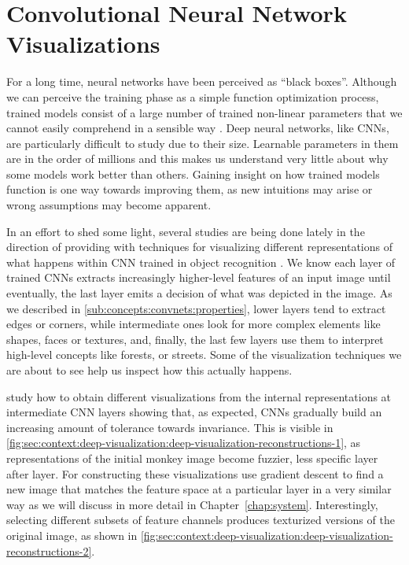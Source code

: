 
\section{Convolutional Neural Network Visualizations}
\label{sec:context:deep-visualization}

For a long time, neural networks have been perceived as ``black boxes''.
Although we can perceive the training phase as a simple function optimization process, trained models consist of a large number of trained non-linear parameters that we cannot easily comprehend in a sensible way \cite{Yosinski2015}.
Deep neural networks, like CNNs, are particularly difficult to study due to their size.
Learnable parameters in them are in the order of millions and this makes us understand very little about why some models work better than others.
Gaining insight on how trained models function is one way towards improving them, as new intuitions may arise or wrong assumptions may become apparent.

In an effort to shed some light, several studies are being done lately in the direction of providing with techniques for visualizing different representations of what happens within CNN trained in object recognition \cite{Dosovitskiy2015,Yosinski2015,Zeiler2014}.
We know each layer of trained CNNs extracts increasingly higher-level features of an input image until eventually, the last layer emits a decision of what was depicted in the image.
As we described in \autoref{sub:concepts:convnets:properties}, lower layers tend to extract edges or corners, while intermediate ones look for more complex elements like shapes, faces or textures, and, finally, the last few layers use them to interpret high-level concepts like forests, or streets.
Some of the visualization techniques we are about to see help us inspect how this actually happens.

\citet{Mahendran2014} study how to obtain different visualizations from the internal representations at intermediate CNN layers showing that, as expected, CNNs gradually build an increasing amount of tolerance towards invariance.
This is visible in \autoref{fig:sec:context:deep-visualization:deep-visualization-reconstructions-1}, as representations of the initial monkey image become fuzzier, less specific layer after layer.
For constructing these visualizations \citeauthor{Mahendran2014} use gradient descent to find a new image that matches the feature space at a particular layer in a very similar way as we will discuss in more detail in Chapter~\ref{chap:system}.
Interestingly, selecting different subsets of feature channels produces texturized versions of the original image, as shown in \autoref{fig:sec:context:deep-visualization:deep-visualization-reconstructions-2}.

